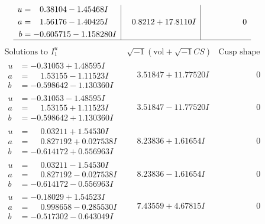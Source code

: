 \documentclass[1p]{elsarticle_modified}
\theoremstyle{definition}
\newcommand{\I}{\sqrt{-1}}
\begin{document}
$$\begin{array}{c|c|c}
\begin{aligned}
u &= \phantom{-}0.38104 - 1.45468 I \\
a &= \phantom{-}1.56176 - 1.40425 I \\
b &= -0.605715 - 1.158280 I\end{aligned}
 & \phantom{-}0.8212 + 17.8110 I & \phantom{-0.000000 } 0\\
 \hline 
 \end{array}$$\newpage$$\begin{array}{c|c|c}  
\text{Solutions to }I^u_{1}& \I (\text{vol} + \sqrt{-1}CS) & \text{Cusp shape}\\
 \hline 
\begin{aligned}
u &= -0.31053 + 1.48595 I \\
a &= \phantom{-}1.53155 - 1.11523 I \\
b &= -0.598642 - 1.130360 I\end{aligned}
 & \phantom{-}3.51847 + 11.77520 I & \phantom{-0.000000 } 0 \\ \hline\begin{aligned}
u &= -0.31053 - 1.48595 I \\
a &= \phantom{-}1.53155 + 1.11523 I \\
b &= -0.598642 + 1.130360 I\end{aligned}
 & \phantom{-}3.51847 - 11.77520 I & \phantom{-0.000000 } 0 \\ \hline\begin{aligned}
u &= \phantom{-}0.03211 + 1.54530 I \\
a &= \phantom{-}0.827192 + 0.027538 I \\
b &= -0.614172 + 0.556963 I\end{aligned}
 & \phantom{-}8.23836 + 1.61654 I & \phantom{-0.000000 } 0 \\ \hline\begin{aligned}
u &= \phantom{-}0.03211 - 1.54530 I \\
a &= \phantom{-}0.827192 - 0.027538 I \\
b &= -0.614172 - 0.556963 I\end{aligned}
 & \phantom{-}8.23836 - 1.61654 I & \phantom{-0.000000 } 0 \\ \hline\begin{aligned}
u &= -0.18029 + 1.54523 I \\
a &= \phantom{-}0.998658 - 0.285530 I \\
b &= -0.517302 - 0.643049 I\end{aligned}
 & \phantom{-}7.43559 + 4.67815 I & \phantom{-0.000000 } 0 \\ \hline\begin{aligned}

\end{aligned}
\end{array}$$
\end{document}
